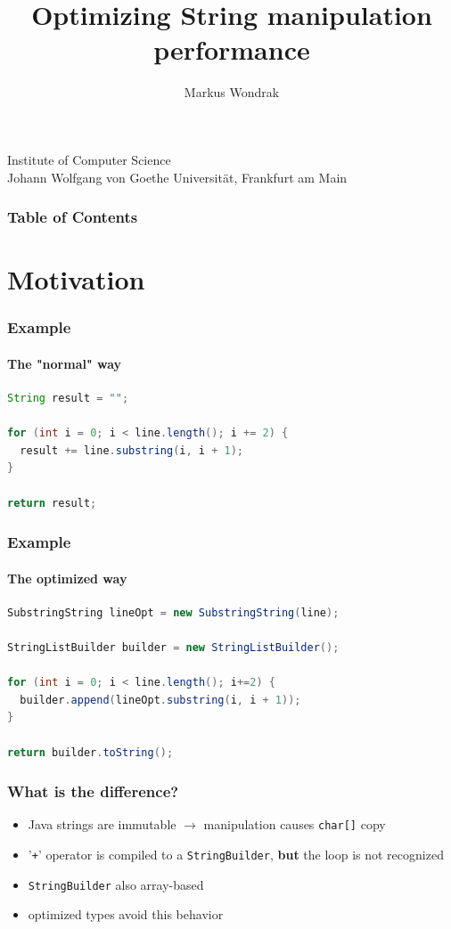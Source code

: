 \documentclass{beamer}
\begin{document}
\title[Optimization]
{Optimizing String manipulation performance}
\author{Markus Wondrak}
\institute
{
  Institute of Computer Science\\
  Johann Wolfgang von Goethe Universität, Frankfurt am Main
}

\frame{\titlepage}

\begin{frame}
  \frametitle{Table of Contents}
  \tableofcontents
\end{frame}

\section{Motivation}  

\frame{\sectionpage}

\begin{frame}[fragile]

  \frametitle{Example}
  \framesubtitle{The "normal" way}

  \begin{lstlisting}[language=Java]
String result = "";

for (int i = 0; i < line.length(); i += 2) {
  result += line.substring(i, i + 1);
}

return result;
  \end{lstlisting}%
\end{frame}


\begin{frame}[fragile]
  \frametitle{Example}
  \framesubtitle{The optimized way}
  \begin{lstlisting}[language=Java]
SubstringString lineOpt = new SubstringString(line);
  
StringListBuilder builder = new StringListBuilder();

for (int i = 0; i < line.length(); i+=2) {
  builder.append(lineOpt.substring(i, i + 1));
}

return builder.toString();
  \end{lstlisting}%
\end{frame}

\begin{frame}
  \frametitle{What is the difference?}
	\begin{itemize}
	  \item Java strings are immutable $\rightarrow$ manipulation causes \texttt{char[]} copy
	  \item '\texttt{+}' operator is compiled to a \texttt{StringBuilder}, {\bf but} the loop is not recognized
	  \item \texttt{StringBuilder} also array-based 

	  \item optimized types avoid this behavior 
	\end{itemize}
\end{frame}
\end{document}
